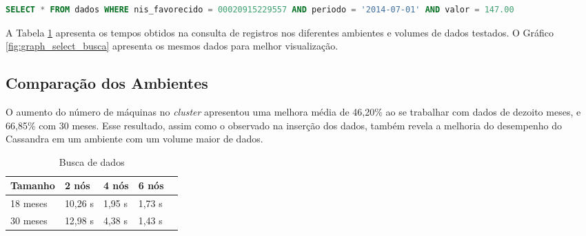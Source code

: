 \begin{lstlisting}[caption={Consulta CQL},label={lst:cql_select},language=SQL]
SELECT * FROM dados WHERE nis_favorecido = 00020915229557 AND periodo = '2014-07-01' AND valor = 147.00 
\end{lstlisting}

A Tabela \ref{tab:select_busca} apresenta os tempos obtidos na consulta de registros nos diferentes ambientes e volumes de dados testados. O Gráfico \ref{fig:graph_select_busca} apresenta os mesmos dados para melhor visualização.

\subsection{Comparação dos Ambientes}
O aumento do número de máquinas no \emph{cluster} apresentou uma melhora média de 46,20\% ao se trabalhar com dados de dezoito meses, e 66,85\% com 30 meses. Esse resultado, assim como o observado na inserção dos dados, também revela a melhoria do desempenho do Cassandra em um ambiente com um volume maior de dados.

\begin{table}[]
	\centering
	\caption{Busca de dados}
	\label{tab:select_busca}
	\begin{tabular}{lllll}
		\textbf{Tamanho} & \textbf{2 nós} & \textbf{4 nós} & \textbf{6 nós} \\ \hline
		18 meses         & 10,26 s        & 1,95 s        & 1,73 s        \\ \hline
		30 meses         & 12,98 s        & 4,38 s        & 1,43 s         \\ \hline
	\end{tabular}
\end{table}

